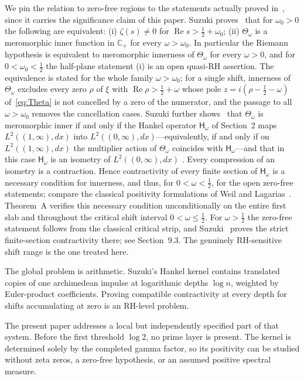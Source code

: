 \documentclass[11pt,a4paper]{article}
\newcommand{\Cp}{\mathbb C_+}
\renewcommand{\Re}{\operatorname{Re}}
\newcommand{\Hsf}{\mathsf H}
\theoremstyle{plain}
\theoremstyle{definition}
\numberwithin{equation}{section}
\begin{document}
We pin the relation to zero-free regions to the statements actually proved
in~\cite{Suzuki2012}, since it carries the significance claim of this paper.
Suzuki proves~\cite[Prop.~1.2]{Suzuki2012} that for $\omega_0>0$ the following
are equivalent: (i) $\zeta(s)\neq0$ for $\Re s>\tfrac12+\omega_0$;
(ii) $\Theta_\omega$ is a meromorphic inner function in $\Cp$ for every
$\omega>\omega_0$. In particular the Riemann hypothesis is equivalent to
meromorphic innerness of $\Theta_\omega$ for every $\omega>0$, and for
$0<\omega_0<\tfrac12$ the half-plane statement (i) is an open quasi-RH
assertion. The equivalence is stated for the whole family
$\omega>\omega_0$; for a single shift, innerness of $\Theta_\omega$ excludes
every zero $\rho$ of $\xi$ with $\Re\rho>\tfrac12+\omega$ whose pole
$z=i(\rho-\tfrac12-\omega)$ of~\eqref{eq:Theta} is not cancelled by a zero of
the numerator, and the passage to all $\omega>\omega_0$ removes the
cancellation cases. Suzuki further shows~\cite[Thm.~2.2]{Suzuki2012} that
$\Theta_\omega$ is meromorphic inner if and only if the Hankel operator
$\Hsf_\omega$ of Section~2 maps $L^2((1,\infty),dx)$ into
$L^2((0,\infty),dx)$---equivalently, if and only if on $L^2((1,\infty),dx)$
the multiplier action of $\Theta_\omega$ coincides with $\Hsf_\omega$---and
that in this case $\Hsf_\omega$ is an isometry of $L^2((0,\infty),dx)$
\cite[Lemma~4.1]{Suzuki2012}. Every compression of an isometry is a
contraction. Hence contractivity of
every finite section of $\Hsf_\omega$ is a necessary condition for innerness,
and thus, for $0<\omega<\tfrac12$, for the open zero-free statements; compare
the classical positivity formulations of Weil and Lagarias~\cite{Lagarias1999}.
Theorem~A verifies this necessary condition unconditionally on the entire
first slab and throughout the critical shift interval $0<\omega\le\tfrac12$.
For $\omega>\tfrac12$ the zero-free statement follows from the classical
critical strip, and Suzuki~\cite[Lemma~4.4]{Suzuki2012} proves the strict
finite-section contractivity there; see Section~9.3. The genuinely
RH-sensitive shift range is the one treated here.

The global problem is arithmetic. Suzuki's Hankel kernel contains translated
copies of one archimedean impulse at logarithmic depths $\log n$, weighted by
Euler-product coefficients. Proving compatible contractivity at every depth
for shifts accumulating at zero is an RH-level problem.

The present paper addresses a local but independently specified part of that
system. Before the first threshold $\log2$, no prime layer is present. The
kernel is determined solely by the completed gamma factor, so its positivity
can be studied without zeta zeros, a zero-free hypothesis, or an assumed
positive spectral measure.
\end{document}
